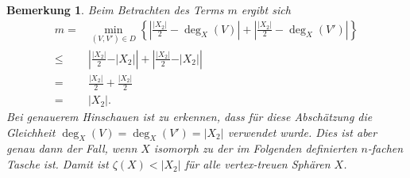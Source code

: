 \documentclass[12pt,titlepage,twoside,cleardoublepage]{article}
\theoremstyle{nummermitklammern}
\newtheorem{bemerkung}[temp]{Bemerkung}
\newtheorem{bemerkung}[zahl]{Bemerkung}
\numberwithin{equation}{section}
\begin{document}
\begin{bemerkung}
Beim Betrachten des Terms $m$ ergibt sich
\begin{align*}
m=&\underset{{(V,V')\in D}}{\min}\left\{\left|\frac{\vert X_2 \vert}{2}-\deg_X(V)\right| +\left| \frac{\vert X_2 \vert}{2}-\deg_X(V')\right|\right\}\\
\leq& \left|\frac{\vert X_2 \vert}{2}-\vert X_2\vert\right| +\left| \frac{\vert X_2 \vert}{2}-\vert X_2\vert\right| \\
=&\frac{\vert X_2 \vert}{2}+\frac{\vert X_2 \vert}{2}\\
=&\vert X_2 \vert.
\end{align*}
Bei genauerem Hinschauen ist zu erkennen, dass für diese Abschätzung die Gleichheit $\deg_X(V)=\deg_X(V')=\vert X_2 \vert$ verwendet wurde. Dies ist aber genau dann der Fall, wenn $X$ isomorph zu der im Folgenden definierten $n$-fachen Tasche ist. 
Damit ist $\zeta (X)< \vert X_2 \vert$ für alle vertex-treuen Sphären $X$. 
\end{bemerkung}
\end{document}
